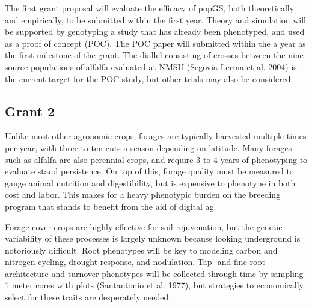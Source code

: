 \documentclass[10pt]{article}
\begin{document}


The first grant proposal will evaluate the efficacy of popGS, both theoretically and empirically, to be submitted within the first year. Theory and simulation will be supported by genotyping a study that has already been phenotyped, and used as a proof of concept (POC). The POC paper will submitted within the a year as the first milestone of the grant. The diallel consisting of crosses between the nine source populations of alfalfa evaluated at NMSU (Segovia Lerma et al. 2004) is the current target for the POC study, but other trials may also be considered.%


\subsection*{Grant 2}

Unlike most other agronomic crops, forages are typically harvested multiple times per year, with three to ten cuts a season depending on latitude. Many forages such as alfalfa are also perennial crops, and require 3 to 4 years of phenotyping to evaluate stand persistence. On top of this, forage quality must be measured to gauge animal nutrition and digestibility, but is expensive to phenotype in both cost and labor. This makes for a heavy phenotypic burden on the breeding program that stands to benefit from the aid of digital ag. 

Forage cover crops are highly effective for soil rejuvenation, but the genetic variability of these processes is largely unknown because looking underground is notoriously difficult. Root phenotypes will be key to modeling carbon and nitrogen cycling, drought response, and nodulation. Tap- and fine-root architecture and turnover phenotypes will be collected through time by sampling 1 meter cores with plots (Santantonio et al. 1977), but strategies to economically select for these traits are desperately needed. %
\end{document}
